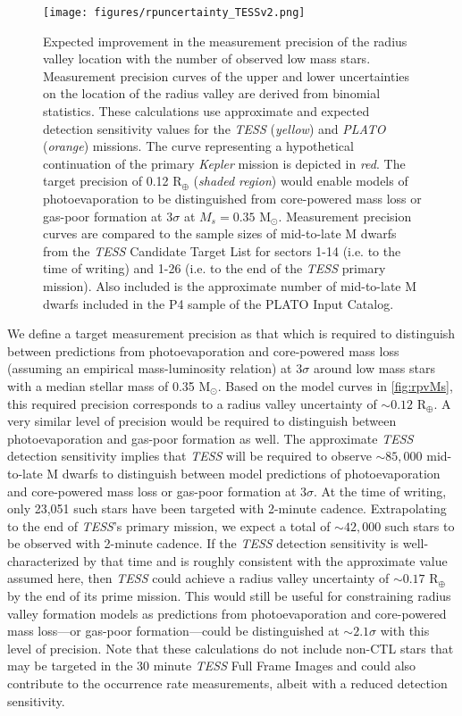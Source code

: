 \documentclass[twocolumn]{emulateapj}
\newcommand{\kepler}[1]{\emph{Kepler}#1}
\newcommand{\tess}[1]{\emph{TESS}#1}
\newcommand{\plato}[1]{\emph{PLATO}#1}
\begin{document}
\begin{figure}
  \centering
  \texttt{[image: figures/rpuncertainty\_TESSv2.png]}
  \caption{Expected improvement in the measurement precision of the radius valley location with the number of observed
    low mass stars. Measurement precision curves of the upper and lower uncertainties on the location of the radius valley 
    are derived from binomial statistics. These calculations use approximate and expected detection sensitivity
    values for the \tess{} (\emph{yellow}) and \plato{} (\emph{orange}) missions. The curve representing a hypothetical continuation
    of the primary \kepler{} mission is depicted in \emph{red}. The target precision of 0.12 R$_{\oplus}$ (\emph{shaded region})
    would enable models of photoevaporation to be distinguished from core-powered mass loss or gas-poor formation at $3\sigma$
    at $M_s=0.35$ M$_{\odot}$. Measurement precision curves are compared to the sample sizes of mid-to-late M dwarfs from the \tess{}
    Candidate Target List for sectors 1-14 (i.e. to the time of writing) and 1-26 (i.e. to the end of the \tess{} primary
    mission). Also included is the approximate number of mid-to-late M dwarfs included in the P4 sample of the
    PLATO Input Catalog.}
  \label{fig:improve}
\end{figure}


We define a target measurement precision as that which is required to distinguish between predictions from photoevaporation
and core-powered mass loss (assuming an empirical mass-luminosity relation) at $3\sigma$ around low mass stars with a median
stellar mass of 0.35 M$_{\odot}$. Based on the model curves in \autoref{fig:rpvMs},
this required precision corresponds to a radius valley uncertainty of $\sim 0.12$ R$_{\oplus}$. A very similar level
of precision would be required to distinguish between photoevaporation and gas-poor formation as well.
The approximate \tess{} detection sensitivity implies that \tess{} will be required to observe $\sim 85,000$ mid-to-late M dwarfs
to distinguish between model predictions of photoevaporation and core-powered mass loss or gas-poor formation at $3\sigma$.
At the time of writing, only 23,051 such stars have been targeted with 2-minute cadence. Extrapolating to the end of \tess{'s}
primary mission, we expect a total of $\sim 42,000$ such stars to be observed with 2-minute cadence. If the \tess{} detection
sensitivity is well-characterized by that time and is roughly consistent with the approximate value assumed here, then \tess{}
could achieve a radius valley uncertainty of $\sim 0.17$ R$_{\oplus}$ by the end of its prime mission.
This would still be useful for constraining radius valley formation models as predictions from photoevaporation and
core-powered mass loss---or gas-poor formation---could be distinguished at $\sim 2.1\sigma$ with this level of precision.
Note that these calculations do not include non-CTL stars that may be targeted in the 30 minute \tess{} Full Frame Images
and could also contribute to the occurrence rate measurements, albeit with a reduced detection sensitivity.
\end{document}
